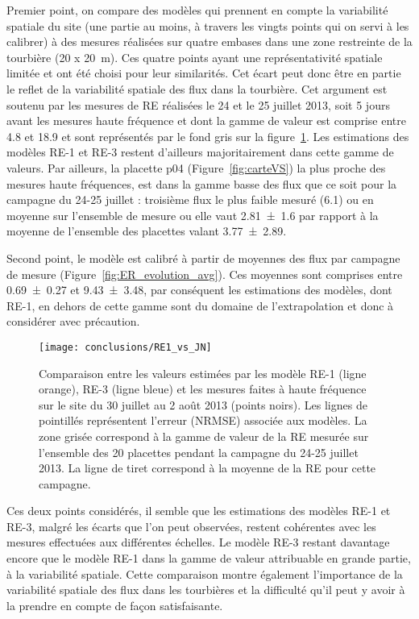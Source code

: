 Premier point, on compare des modèles qui prennent en compte la variabilité spatiale du site (une partie au moins, à travers les vingts points qui on servi à les calibrer) à des mesures réalisées sur quatre embases dans une zone restreinte de la tourbière (20 x \SI{20}{\metre}).
Ces quatre points ayant une représentativité spatiale limitée et ont été choisi pour leur similarités.
Cet écart peut donc être en partie le reflet de la variabilité spatiale des flux dans la tourbière.
Cet argument est soutenu par les mesures de RE réalisées le 24 et le 25 juillet 2013, soit 5 jours avant les mesures haute fréquence et dont la gamme de valeur est comprise entre \num{4.8} et \SI{18.9}{\uml} et sont représentés par le fond gris sur la figure~\ref{fig:RE1_vs_JN}.
Les estimations des modèles RE-1 et RE-3 restent d'ailleurs majoritairement dans cette gamme de valeurs.
Par ailleurs, la placette p04 (Figure~\ref{fig:carteVS}) la plus proche des mesures haute fréquences, est dans la gamme basse des flux que ce soit pour la campagne du 24-25 juillet : troisième flux le plus faible mesuré (\SI{6.1}{\uml}) ou en moyenne sur l'ensemble de mesure ou elle vaut \SI{2.81(160)}{\uml} par rapport à la moyenne de l'ensemble des placettes valant \SI{3.77(289)}{\uml}.

Second point, le modèle est calibré à partir de moyennes des flux par campagne de mesure (Figure~\ref{fig:ER_evolution_avg}).
Ces moyennes sont comprises entre \num{0.69(027)} et \SI{9.43(348)}{\uml}, par conséquent les estimations des modèles, dont RE-1, en dehors de cette gamme sont du domaine de l'extrapolation et donc à considérer avec précaution.

\begin{figure}
\centering
\texttt{[image: conclusions/RE1\_vs\_JN]}
\caption{Comparaison entre les valeurs estimées par les modèle RE-1 (ligne orange), RE-3 (ligne bleue) et les mesures faites à haute fréquence sur le site du 30 juillet au 2 août 2013 (points noirs). Les lignes de pointillés représentent l'erreur (NRMSE) associée aux modèles. La zone grisée correspond à la gamme de valeur de la RE mesurée sur l'ensemble des 20 placettes pendant la campagne du 24-25 juillet 2013. La ligne de tiret correspond à la moyenne de la RE pour cette campagne.}
\label{fig:RE1_vs_JN}
\end{figure}

Ces deux points considérés, il semble que les estimations des modèles RE-1 et RE-3, malgré les écarts que l'on peut observées, restent cohérentes avec les mesures effectuées aux différentes échelles.
Le modèle RE-3 restant davantage encore que le modèle RE-1 dans la gamme de valeur attribuable en grande partie, à la variabilité spatiale.
Cette comparaison montre également l'importance de la variabilité spatiale des flux dans les tourbières et la difficulté qu'il peut y avoir à la prendre en compte de façon satisfaisante.




